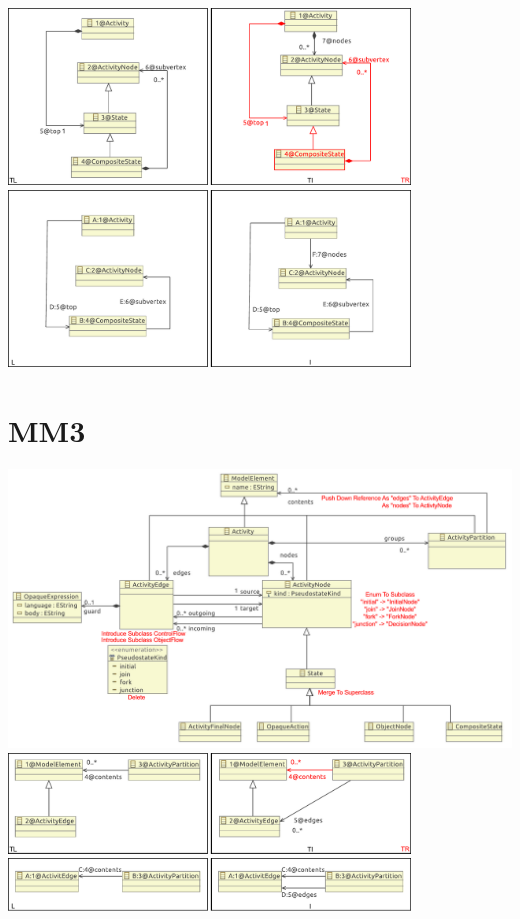 \documentclass[a4paper,10pt]{article}
\begin{document}
\includegraphics[width=0.8\textwidth]{2/mm2_replace_composition_of_references.pdf}\\
\includegraphics[width=0.8\textwidth]{2/mm2_replace_composition_of_references_m.pdf}


\section{MM3}

\includegraphics[width=\textwidth]{3/original_minimal_metamodel_3}\\

\includegraphics[width=0.8\textwidth]{3/mm3_replace_reference}\\
\includegraphics[width=0.8\textwidth]{3/mm3_replace_reference_m}\\
\end{document}
